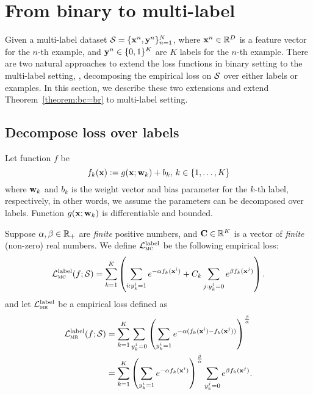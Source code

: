 \section{From binary to multi-label}
\label{sec:ml}

Given a multi-label dataset $\mathcal{S} = \{\mathbf{x}^n, \mathbf{y}^n\}_{n=1}^N$, where $\mathbf{x}^n \in \mathbb{R}^D$ is a feature vector for the $n$-th example,
and $\mathbf{y}^n \in \{0,1\}^K$ are $K$ labels for the $n$-th example.
There are two natural approaches to extend the loss functions in binary setting to the multi-label setting, 
\ie, decomposing the empirical loss on $\mathcal{S}$ over either labels or examples.
In this section, we describe these two extensions and extend Theorem~\ref{theorem:bc=br} to multi-label setting.


\subsection{Decompose loss over labels}

Let function $f$ be
\begin{equation*}
f_k(\mathbf{x}) := g(\mathbf{x}; \mathbf{w}_k) + b_k, \, k \in \{1,\dots,K\}
\end{equation*}
where $\mathbf{w}_k$ and $b_k$ is the weight vector and bias parameter for the $k$-th label, respectively,
in other words, we assume the parameters can be decomposed over labels.
Function $g(\mathbf{x}; \mathbf{w}_k)$ is differentiable and bounded.

Suppose $\alpha, \beta \in \mathbb{R}_+$ are \emph{finite} positive numbers, 
and $\mathbf{C} \in \mathbb{R}^K$ is a vector of \emph{finite} (non-zero) real numbers.
We define $\mathcal{L}_\textsc{mc}^\text{label}$ be the following empirical loss:
\begin{equation}
\label{eq:mc1}
\displaystyle
\mathcal{L}_\textsc{mc}^\text{label}(f; \mathcal{S})
= \sum_{k=1}^K \left(
      \sum_{i: y_k^i = 1} e^{-\alpha f_k(\mathbf{x}^i)} +
  C_k \sum_{j: y_k^j = 0} e^{ \beta  f_k(\mathbf{x}^j)} \right).
\end{equation}
and let $\mathcal{L}_\textsc{mr}^\text{label}$ be a empirical loss defined as
\begin{equation}
\label{eq:mr1}
\begin{aligned}
\displaystyle
\mathcal{L}_\textsc{mr}^\text{label}(f; \mathcal{S})
&= \sum_{k=1}^K
   \sum_{y_k^j = 0} \left( \sum_{y_k^i = 1} e^{-\alpha(f_k(\mathbf{x}^i) - f_k(\mathbf{x}^j))} \right)^\frac{\beta}{\alpha} \\
&= \sum_{k=1}^K \left( 
   \sum_{y_k^i = 1} e^{-\alpha f_k(\mathbf{x}^i)} \right)^\frac{\beta}{\alpha} 
   \sum_{y_k^j = 0} e^{ \beta  f_k(\mathbf{x}^j)}.
\end{aligned}
\end{equation}


